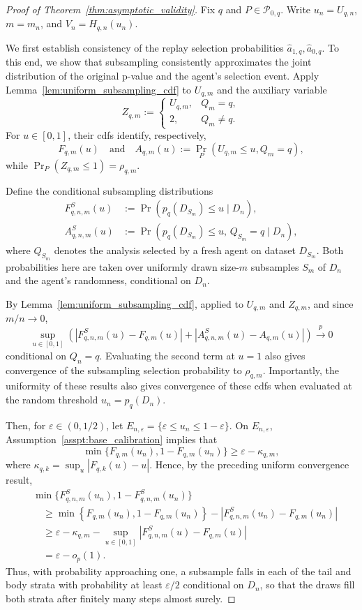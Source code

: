 \documentclass[10pt]{article}
\begin{document}
\begin{proof}[Proof of Theorem~\ref{thm:asymptotic_validity}]
Fix $q$ and $P\in\mathcal P_{0,q}$. Write $u_n=U_{q,n}$,
$m=m_n$, and $V_n=H_{q,n}(u_n)$.

We first establish consistency of the replay selection probabilities $\widehat a_{1,q}, \widehat a_{0,q}$. To this end, we show that subsampling consistently approximates the joint distribution of the original p-value and the agent's
selection event. Apply Lemma~\ref{lem:uniform_subsampling_cdf}
to $U_{q,m}$ and the auxiliary variable
\[
Z_{q,m}:=
\begin{cases}
U_{q,m}, & Q_m=q,\\
2, & Q_m\ne q.
\end{cases}
\]
For $u\in[0,1]$, their cdfs identify, respectively,
\[
F_{q,m}(u)
\quad\text{and}\quad
A_{q,m}(u):=\Pr_P(U_{q,m}\le u,Q_m=q),
\]
while $\Pr_P(Z_{q,m}\le1)=\rho_{q,m}$.

Define the conditional subsampling distributions
\[
\begin{aligned}
F_{q,n,m}^S(u)
&:=\Pr\left(p_q(D_{S_m})\le u\mid D_n\right),\\
A_{q,n,m}^S(u)
&:=\Pr\left(p_q(D_{S_m})\le u,\,
Q_{S_m}=q\mid D_n\right),
\end{aligned}
\]
where $Q_{S_m}$ denotes the analysis selected by a
fresh agent on dataset $D_{S_m}$. Both probabilities here are taken over
uniformly drawn size-$m$ subsamples $S_m$ of $D_n$ and
the agent's randomness, conditional on $D_n$.

By Lemma~\ref{lem:uniform_subsampling_cdf}, applied to
$U_{q,m}$ and $Z_{q,m}$, and since $m/n\to0$,
\[
\sup_{u\in[0,1]}
\left(
|F_{q,n,m}^S(u)-F_{q,m}(u)|
+
|A_{q,n,m}^S(u)-A_{q,m}(u)|
\right)
\stackrel{p}{\longrightarrow}0
\]
conditional on $Q_n=q$. Evaluating the
second term at $u=1$ also gives convergence of the
subsampling selection probability to $\rho_{q,m}$.
Importantly, the uniformity of these results also gives convergence of these cdfs when evaluated at the random threshold $u_n = p_q(D_n)$.

Then, for $\varepsilon\in(0,1/2)$,
let $E_{n,\varepsilon}=\{\varepsilon\le u_n\le1-\varepsilon\}$. On $E_{n,\varepsilon}$, Assumption~\ref{asspt:base_calibration}
implies that
\[
\min\{F_{q,m}(u_n),1-F_{q,m}(u_n)\}
\ge \varepsilon-\kappa_{q,m},
\]
where $\kappa_{q,k}=\sup_u|F_{q,k}(u)-u|$.
Hence, by the preceding uniform convergence result,
\[
\begin{aligned}
&\min\{F_{q,n,m}^S(u_n),
       1-F_{q,n,m}^S(u_n)\}\\
& \quad \geq \min \left\{F_{q, m}\left(u_n\right), 1-F_{q, m}\left(u_n\right)\right\} -\left|F_{q,n,m}^S\left(u_n\right)-F_{q, m}\left(u_n\right)\right| \\
&\quad\ge \varepsilon-\kappa_{q,m}
-\sup_{u\in[0,1]}
|F_{q,n,m}^S(u)-F_{q,m}(u)|\\
&\quad=\varepsilon-o_p(1).
\end{aligned}
\]
Thus, with probability approaching one, a subsample falls in each of the tail and body strata with probability at least $\varepsilon/2$ conditional on $D_n$, so that the draws fill both strata after finitely many steps almost surely.


\end{proof}
\end{document}
